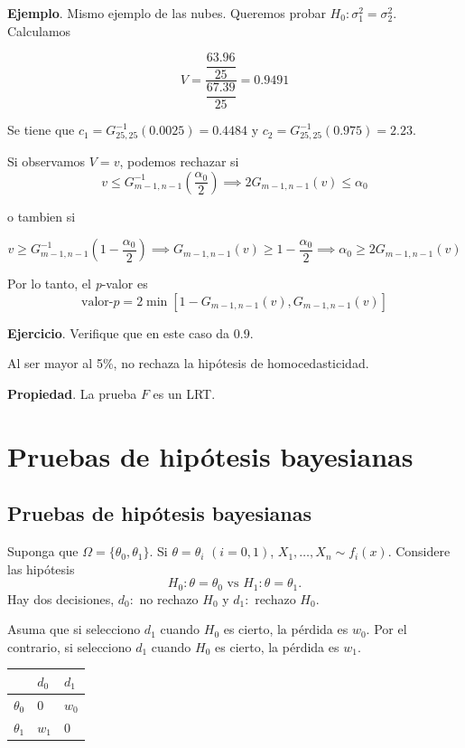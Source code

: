 \documentclass[
  12pt,
]{book}
\begin{document}
\textbf{Ejemplo}. Mismo ejemplo de las nubes. Queremos probar \(H_0:\sigma_1^2 = \sigma_2^2\). Calculamos

\[V = \dfrac{\dfrac{63.96}{25}}{\dfrac{67.39}{25}} = 0.9491\]

Se tiene que \(c_1 = G^{-1}_{25,25}(0.0025) = 0.4484\) y \(c_2 = G^{-1}_{25,25}(0.975) = 2.23\).

Si observamos \(V=v\), podemos rechazar si\\
\[
v\leq G^{-1}_{m-1,n-1}\left(\dfrac{\alpha_0}2\right) \implies 2G_{m-1,n-1}(v)\leq \alpha_0
\]

o tambien si

\[v\geq G^{-1}_{m-1,n-1}\left(1-\dfrac{\alpha_0}2 \right) \implies G_{m-1,n-1}(v) \geq 1-\dfrac{\alpha_0}2 \implies \alpha_0\geq 2G_{m-1,n-1}(v) \]

Por lo tanto, el \emph{p}-valor es
\[\text{valor-}p = 2\min[1-G_{m-1,n-1}(v), G_{m-1,n-1}(v)]\]

\textbf{Ejercicio}. Verifique que en este caso da 0.9.

Al ser mayor al 5\%, no rechaza la hipótesis de homocedasticidad.

\textbf{Propiedad}. La prueba \(F\) es un LRT.

\hypertarget{pruebas-de-hipuxf3tesis-bayesianas}{%
\chapter{Pruebas de hipótesis bayesianas}\label{pruebas-de-hipuxf3tesis-bayesianas}}

\hypertarget{pruebas-de-hipuxf3tesis-bayesianas-1}{%
\section{Pruebas de hipótesis bayesianas}\label{pruebas-de-hipuxf3tesis-bayesianas-1}}

Suponga que \(\Omega = \{\theta_0,\theta_1\}\). Si \(\theta = \theta_i\) \((i = 0,1)\), \(X_1,\dots, X_n\sim f_i(x)\). Considere las hipótesis
\[H_0: \theta = \theta_0 \text{ vs } H_1: \theta =\theta_1.\]
Hay dos decisiones, \(d_0:\) no rechazo \(H_0\) y \(d_1:\) rechazo \(H_0\).

Asuma que si selecciono \(d_1\) cuando \(H_0\) es cierto, la pérdida es \(w_0\). Por el contrario, si selecciono \(d_1\) cuando \(H_0\) es cierto, la pérdida es \(w_1\).

\begin{longtable}[]{@{}lll@{}}
\toprule
& \(d_0\) & \(d_1\)\tabularnewline
\midrule
\endhead
\(\theta_0\) & 0 & \(w_0\)\tabularnewline
\(\theta_1\) & \(w_1\) & 0\tabularnewline
\bottomrule
\end{longtable}
\end{document}
